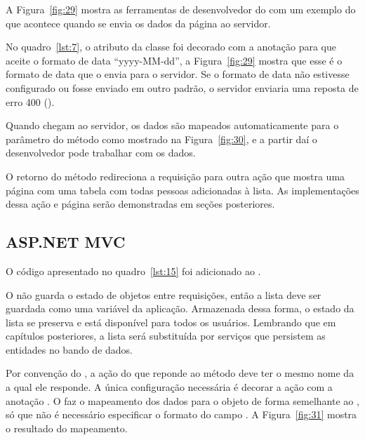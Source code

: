 A Figura~\ref{fig:29} mostra as ferramentas de desenvolvedor do  com um exemplo do que acontece quando se envia os dados da página ao servidor.


No quadro~\ref{lst:7}, o atributo  da classe  foi decorado com a anotação  para que aceite o formato de data “yyyy-MM-dd”, a Figura~\ref{fig:29} mostra que esse é o formato de data que o  envia para o servidor. Se o formato de data não estivesse configurado ou fosse enviado em outro padrão, o servidor enviaria uma reposta de erro 400 ().

Quando chegam ao servidor, os dados são mapeados automaticamente para o parâmetro  do método  como mostrado na Figura~\ref{fig:30}, e a partir daí o desenvolvedor pode trabalhar com os dados.


O retorno do método  redireciona a requisição para outra ação que mostra uma página com uma tabela com todas pessoas adicionadas à lista. As implementações dessa ação e página serão demonstradas em seções posteriores.

\subsection{ASP.NET MVC}

O código apresentado no quadro~\ref{lst:15} foi adicionado ao .


O  não guarda o estado de objetos entre requisições, então a lista deve ser guardada como uma variável da aplicação. Armazenada dessa forma, o estado da lista se preserva e está disponível para todos os usuários. Lembrando que em capítulos posteriores, a lista será substituída por serviços que persistem as entidades no bando de dados.

Por convenção do , a ação do  que reponde ao método  deve ter o mesmo nome da  a qual ele responde.  A única configuração necessária é decorar a ação com a anotação . O  faz o mapeamento dos dados para o objeto  de forma semelhante ao , só que não é necessário especificar o formato do campo . A Figura~\ref{fig:31} mostra o resultado do mapeamento.

